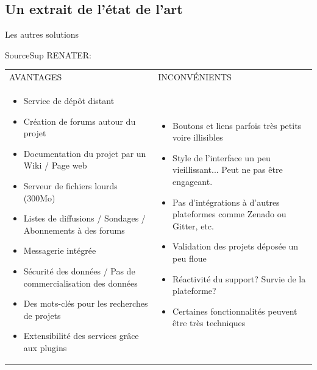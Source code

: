 \documentclass{beamer}
\begin{document}
\subsection{Un extrait de l'état de l'art}
\begin{frame}{Les autres solutions}

SourceSup RENATER:
\tiny
\setlength{\arrayrulewidth}{0.5mm}
\begin{center}
\begin{tabular}{ | m{20em} | m{20em}| } 
\hline
 \rowcolor{lightgray} \multicolumn{2}{|c|}{\textbf{Analyse de la solution SourceSup Renater}} \\
\hline
\cellcolor{green} AVANTAGES & \cellcolor{red} INCONVÉNIENTS \\ 
\hline
\medskip
\begin{itemize}
    \item Service de dépôt distant
    \item Création de forums autour du projet
    \item Documentation du projet par un Wiki / Page web
    \item Serveur de fichiers lourds (300Mo)
    \item Listes de diffusions / Sondages / Abonnements à des forums
    \item Messagerie intégrée
    \item Sécurité des données / Pas de commercialisation des données
    \item Des mots-clés pour les recherches de projets
    \item Extensibilité des services grâce aux plugins
\end{itemize} 

& 
\medskip
\begin{itemize}
    \item Boutons et liens parfois très petits voire illisibles
    \item Style de l'interface un peu vieillissant... Peut ne pas être engageant.
    \item Pas d'intégrations à d'autres plateformes comme Zenado ou Gitter, etc.
    \item Validation des projets déposée un peu floue
    \item Réactivité du support? Survie de la plateforme?
    \item Certaines fonctionnalités peuvent être très techniques
\end{itemize} 
\\ 
\hline
\end{tabular}
\end{center}
\bigskip
\normalsize
\end{frame}
\end{document}
